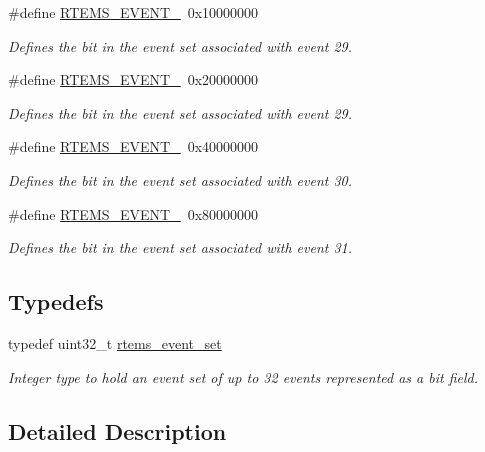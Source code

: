 \begin{DoxyCompactItemize}
\mbox{\label{group__ClassicEventSet_ga1ef6d84ff8e1ef2c855ddbdf6aa18aa6}} 
\#define \mbox{\hyperlink{group__ClassicEventSet_ga1ef6d84ff8e1ef2c855ddbdf6aa18aa6}{R\+T\+E\+M\+S\+\_\+\+E\+V\+E\+N\+T\+\_}}~0x10000000
\begin{DoxyCompactList}\small\item\em Defines the bit in the event set associated with event 29. \end{DoxyCompactList}\item 
\mbox{\label{group__ClassicEventSet_ga23dda51c332b49103563828555a5e15d}} 
\#define \mbox{\hyperlink{group__ClassicEventSet_ga23dda51c332b49103563828555a5e15d}{R\+T\+E\+M\+S\+\_\+\+E\+V\+E\+N\+T\+\_}}~0x20000000
\begin{DoxyCompactList}\small\item\em Defines the bit in the event set associated with event 29. \end{DoxyCompactList}\item 
\mbox{\label{group__ClassicEventSet_ga9b0618f3eab8b9fb4b1d0fb7f0d1cd7a}} 
\#define \mbox{\hyperlink{group__ClassicEventSet_ga9b0618f3eab8b9fb4b1d0fb7f0d1cd7a}{R\+T\+E\+M\+S\+\_\+\+E\+V\+E\+N\+T\+\_}}~0x40000000
\begin{DoxyCompactList}\small\item\em Defines the bit in the event set associated with event 30. \end{DoxyCompactList}\item 
\mbox{\label{group__ClassicEventSet_gac9fdddefb1a966354c315634c2390b66}} 
\#define \mbox{\hyperlink{group__ClassicEventSet_gac9fdddefb1a966354c315634c2390b66}{R\+T\+E\+M\+S\+\_\+\+E\+V\+E\+N\+T\+\_}}~0x80000000
\begin{DoxyCompactList}\small\item\em Defines the bit in the event set associated with event 31. \end{DoxyCompactList}\end{DoxyCompactItemize}
\subsection*{Typedefs}
\begin{DoxyCompactItemize}
\item 
\mbox{\label{group__ClassicEventSet_gab7b8f373bea85fd4e3b7ae23905faa07}} 
typedef uint32\+\_\+t \mbox{\hyperlink{group__ClassicEventSet_gab7b8f373bea85fd4e3b7ae23905faa07}{rtems\+\_\+event\+\_\+set}}
\begin{DoxyCompactList}\small\item\em Integer type to hold an event set of up to 32 events represented as a bit field. \end{DoxyCompactList}\end{DoxyCompactItemize}


\subsection{Detailed Description}
